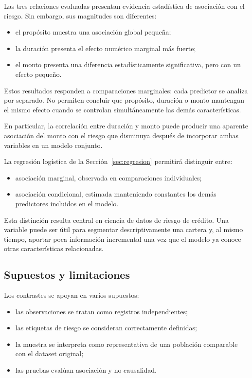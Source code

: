 Las tres relaciones evaluadas presentan evidencia estadística de
asociación con el riesgo. Sin embargo, sus magnitudes son diferentes:

\begin{itemize}
    \item el propósito muestra una asociación global pequeña;

    \item la duración presenta el efecto numérico marginal más fuerte;

    \item el monto presenta una diferencia estadísticamente significativa,
    pero con un efecto pequeño.
\end{itemize}

Estos resultados responden a comparaciones marginales: cada predictor se
analiza por separado. No permiten concluir que propósito, duración o monto
mantengan el mismo efecto cuando se controlan simultáneamente las demás
características.

En particular, la correlación entre duración y monto puede producir una
aparente asociación del monto con el riesgo que disminuya después de
incorporar ambas variables en un modelo conjunto.

La regresión logística de la Sección~\ref{sec:regresion} permitirá
distinguir entre:

\begin{itemize}
    \item asociación marginal, observada en comparaciones individuales;

    \item asociación condicional, estimada manteniendo constantes los
    demás predictores incluidos en el modelo.
\end{itemize}

Esta distinción resulta central en ciencia de datos de riesgo de crédito.
Una variable puede ser útil para segmentar descriptivamente una cartera y,
al mismo tiempo, aportar poca información incremental una vez que el
modelo ya conoce otras características relacionadas.

\subsection{Supuestos y limitaciones}

Los contrastes se apoyan en varios supuestos:

\begin{itemize}
    \item las observaciones se tratan como registros independientes;

    \item las etiquetas de riesgo se consideran correctamente definidas;

    \item la muestra se interpreta como representativa de una población
    comparable con el dataset original;

    \item las pruebas evalúan asociación y no causalidad.
\end{itemize}

